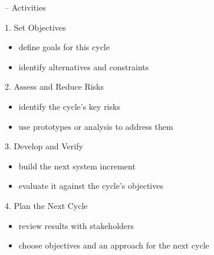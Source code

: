 \begin{frame}{\insertsubsection{} -- Activities\ \mytitlesource{\sommerville}}
    \begin{fancycolumns}[animation=none]
        \begin{definition}{1. Set Objectives}
            \begin{itemize}
                \item define goals for this cycle
                \item identify alternatives and constraints
            \end{itemize}
        \end{definition}
        \begin{definition}{2. Assess and Reduce Risks}
            \begin{itemize}
                \item identify the cycle's key risks
                \item use prototypes or analysis to address them
            \end{itemize}
        \end{definition}
        \nextcolumn
        \begin{definition}{3. Develop and Verify}
            \begin{itemize}
                \item build the next system increment
                \item evaluate it against the cycle's objectives
            \end{itemize}
        \end{definition}
        \begin{definition}{4. Plan the Next Cycle}
            \begin{itemize}
                \item review results with stakeholders
                \item choose objectives and an approach for the next cycle
            \end{itemize}
        \end{definition}
    \end{fancycolumns}
\end{frame}

